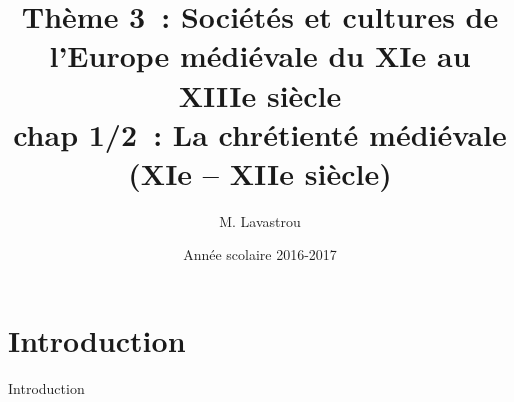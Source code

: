 \documentclass[C]{beamer}
\title{Thème 3~: Sociétés et cultures de l'Europe médiévale du XIe au XIIIe siècle\\ chap 1/2~: La chrétienté médiévale\\ (XIe -- XIIe siècle)}
\author{M. Lavastrou}
\institute{Classes de seconde -- Lycée Jean Lurçat}
\date{Année scolaire 2016-2017}
\begin{document}
	\begin{frame}
	\titlepage
	\end{frame}
	
	\section*{Introduction}
	\begin{frame}{Introduction}
	
	\end{frame}
	
\end{document}
